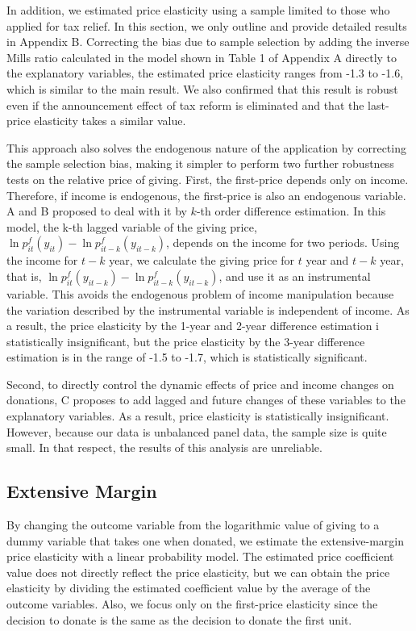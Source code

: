 \documentclass[
  11pt,
  a4paper,
]{article}
\begin{document}
In addition,
we estimated price elasticity
using a sample limited to those who applied for tax relief.
In this section, we only outline and provide detailed results in Appendix B.
Correcting the bias due to sample selection by
adding the inverse Mills ratio calculated in the model
shown in Table 1 of Appendix A directly to the explanatory variables,
the estimated price elasticity ranges from -1.3 to -1.6,
which is similar to the main result.
We also confirmed that
this result is robust
even if the announcement effect of tax reform is eliminated
and that the last-price elasticity takes a similar value.

This approach also solves the endogenous nature of the application
by correcting the sample selection bias,
making it simpler to perform two further robustness tests
on the relative price of giving.
First, the first-price depends only on income.
Therefore, if income is endogenous,
the first-price is also an endogenous variable.
A and B proposed to deal with it by \(k\)-th order difference estimation.
In this model, the k-th lagged variable of the giving price,
\(\ln p^f_{it}(y_{it}) - \ln p^f_{it-k}(y_{it-k})\),
depends on the income for two periods.
Using the income for \(t-k\) year, we calculate the giving price for \(t\) year
and \(t-k\) year, that is,
\(\ln p^f_{it}(y_{it-k}) - \ln p^f_{it-k}(y_{it-k})\),
and use it as an instrumental variable.
This avoids the endogenous problem of income manipulation
because the variation described by the instrumental variable
is independent of income.
As a result,
the price elasticity by the 1-year and 2-year difference estimation i
statistically insignificant,
but the price elasticity by the 3-year difference estimation
is in the range of -1.5 to -1.7, which is statistically significant.

Second,
to directly control the dynamic effects of
price and income changes on donations,
C proposes to add lagged and future changes of these variables
to the explanatory variables.
As a result, price elasticity is statistically insignificant.
However, because our data is unbalanced panel data,
the sample size is quite small.
In that respect, the results of this analysis are unreliable.

\hypertarget{extensive-margin}{%
\subsection{Extensive Margin}\label{extensive-margin}}

By changing the outcome variable
from the logarithmic value of giving
to a dummy variable that takes one when donated,
we estimate the extensive-margin price elasticity
with a linear probability model.
The estimated price coefficient value
does not directly reflect the price elasticity,
but we can obtain the price elasticity
by dividing the estimated coefficient value
by the average of the outcome variables.
Also, we focus only on the first-price elasticity
since the decision to donate is the same as
the decision to donate the first unit.
\end{document}
